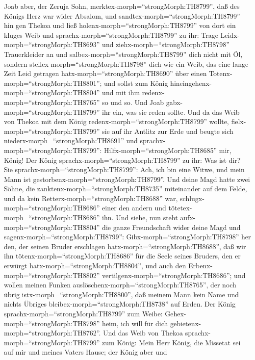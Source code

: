  Joab aber, der Zeruja Sohn,
merktex-morph=``strongMorph:TH8799'', daß des Königs Herz war wider
Absalom,  und sandtex-morph=``strongMorph:TH8799'' hin gen
Thekoa und ließ holenx-morph=``strongMorph:TH8799'' von dort ein kluges
Weib und sprachx-morph=``strongMorph:TH8799'' zu ihr: Trage
Leidx-morph=``strongMorph:TH8693'' und
ziehx-morph=``strongMorph:TH8798'' Trauerkleider an und
salbex-morph=``strongMorph:TH8799'' dich nicht mit Öl, sondern
stellex-morph=``strongMorph:TH8798'' dich wie ein Weib, das eine lange
Zeit Leid getragen hatx-morph=``strongMorph:TH8690'' über einen
Totenx-morph=``strongMorph:TH8801'';  und sollst zum König
hineingehenx-morph=``strongMorph:TH8804'' und mit ihm
redenx-morph=``strongMorph:TH8765'' so und so. Und Joab
gabx-morph=``strongMorph:TH8799'' ihr ein, was sie reden sollte.
 Und da das Weib von Thekoa mit dem König
redenx-morph=``strongMorph:TH8799'' wollte,
fielx-morph=``strongMorph:TH8799'' sie auf ihr Antlitz zur Erde und
beugte sich niederx-morph=``strongMorph:TH8691'' und
sprachx-morph=``strongMorph:TH8799'': Hilfx-morph=``strongMorph:TH8685''
mir, König!  Der König sprachx-morph=``strongMorph:TH8799''
zu ihr: Was ist dir? Sie sprachx-morph=``strongMorph:TH8799'': Ach, ich
bin eine Witwe, und mein Mann ist
gestorbenx-morph=``strongMorph:TH8799''.  Und deine Magd
hatte zwei Söhne, die zanktenx-morph=``strongMorph:TH8735'' miteinander
auf dem Felde, und da kein Retterx-morph=``strongMorph:TH8688'' war,
schlugx-morph=``strongMorph:TH8686'' einer den andern und
tötetex-morph=``strongMorph:TH8686'' ihn.  Und siehe, nun
steht aufx-morph=``strongMorph:TH8804'' die ganze Freundschaft wider
deine Magd und sagenx-morph=``strongMorph:TH8799'':
Gibx-morph=``strongMorph:TH8798'' her den, der seinen Bruder erschlagen
hatx-morph=``strongMorph:TH8688'', daß wir ihn
tötenx-morph=``strongMorph:TH8686'' für die Seele seines Bruders, den er
erwürgt hatx-morph=``strongMorph:TH8804'', und auch den
Erbenx-morph=``strongMorph:TH8802''
vertilgenx-morph=``strongMorph:TH8686''; und wollen meinen Funken
auslöschenx-morph=``strongMorph:TH8765'', der noch übrig
istx-morph=``strongMorph:TH8800'', daß meinem Mann kein Name und nichts
Übriges bleibex-morph=``strongMorph:TH8738'' auf Erden.  Der
König sprachx-morph=``strongMorph:TH8799'' zum Weibe:
Gehex-morph=``strongMorph:TH8798'' heim, ich will für dich
gebietenx-morph=``strongMorph:TH8762''.  Und das Weib von
Thekoa sprachx-morph=``strongMorph:TH8799'' zum König: Mein Herr König,
die Missetat sei auf mir und meines Vaters Hause; der König aber und
